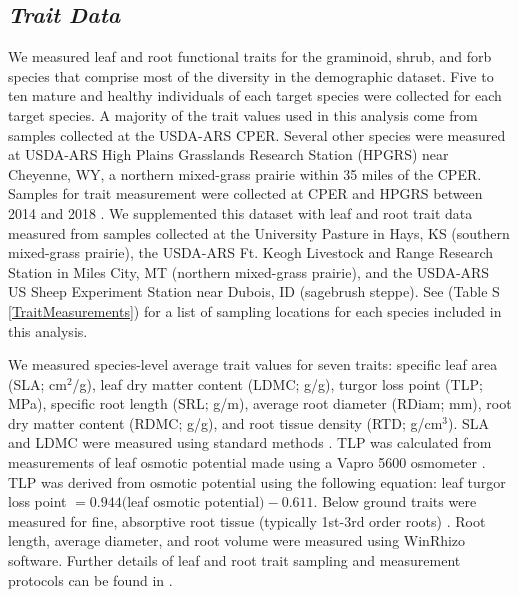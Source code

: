 \documentclass[12pt, letterpaper]{article}
\begin{document}
\subsection{\textit{Trait Data}} We measured leaf and root functional traits for the graminoid, shrub, and forb species that comprise most of the diversity in the demographic dataset. Five to ten mature and healthy individuals of each target species were collected for each target species. A majority of the trait values used in this analysis come from samples collected at the USDA-ARS CPER. Several other species were measured at USDA-ARS High Plains Grasslands Research Station (HPGRS) near Cheyenne, WY, a northern mixed-grass prairie within 35 miles of the CPER. Samples for trait measurement were collected at CPER and HPGRS between 2014 and 2018 \citep{Blumenthal2020}. We supplemented this dataset with leaf and root trait data measured from samples collected at the University Pasture in Hays, KS (southern mixed-grass prairie), the USDA-ARS Ft. Keogh Livestock and Range Research Station in Miles City, MT (northern mixed-grass prairie), and the USDA-ARS US Sheep Experiment Station near Dubois, ID (sagebrush steppe). See (Table S \ref{TraitMeasurements}) for a list of sampling locations for each species included in this analysis. 

We measured species-level average trait values for seven traits: specific leaf area (SLA; cm$^2$/g), leaf dry matter content (LDMC; g/g), turgor loss point (TLP; MPa), specific root length (SRL; g/m), average root diameter (RDiam; mm), root dry matter content (RDMC; g/g), and root tissue density (RTD; g/cm$^3$). SLA and LDMC were measured using standard methods \citep{Perez-Harguindeguy2013}. TLP was calculated from measurements of leaf osmotic potential made using a Vapro 5600 osmometer \citep{Bartlett2012, Griffin-Nolan2019}. TLP was derived from osmotic potential using the following equation: leaf turgor loss point $= 0.944($leaf osmotic potential$) - 0.611$. Below ground traits were measured for fine, absorptive root tissue (typically 1st-3rd order roots) \citep{McCormack2015}. Root length, average diameter, and root volume were measured using WinRhizo software. Further details of leaf and root trait sampling and measurement protocols can be found in \cite{Blumenthal2020}.
\end{document}
